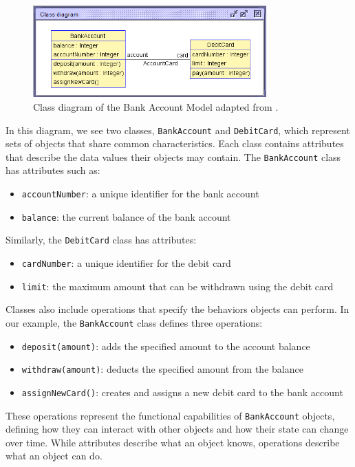 \begin{figure}
    \begin{center}
        \includegraphics[width=0.8\textwidth]{figures/c1/BankAccount/BankAccount_ClassDiagram.png}
        \caption{Class diagram of the Bank Account Model adapted from \cite{TPV}.}
        \label{fig:class_diagram_bank_account_model}
    \end{center}
\end{figure}

In this diagram, we see two classes, \texttt{BankAccount} and \texttt{DebitCard}, 
which represent sets of objects that share common characteristics. Each class 
contains attributes that describe the data values their objects may contain. 
The \texttt{BankAccount} class has attributes such as:
\begin{itemize}
    \item \texttt{accountNumber}: a unique identifier for the bank account
    \item \texttt{balance}: the current balance of the bank account
\end{itemize}
Similarly, the \texttt{DebitCard} class has attributes:
\begin{itemize}
    \item \texttt{cardNumber}: a unique identifier for the debit card
    \item \texttt{limit}: the maximum amount that can be withdrawn using the debit card
\end{itemize}

Classes also include operations that specify the behaviors objects can perform. 
In our example, the \texttt{BankAccount} class defines three operations:
\begin{itemize}
    \item \texttt{deposit(amount)}: adds the specified amount to the account balance
    \item \texttt{withdraw(amount)}: deducts the specified amount from the balance
    \item \texttt{assignNewCard()}: creates and assigns a new debit card to the bank account
\end{itemize}
These operations represent the functional capabilities of \texttt{BankAccount} objects, 
defining how they can interact with other objects and how their state can change over 
time. While attributes describe what an object knows, operations describe what an 
object can do.

